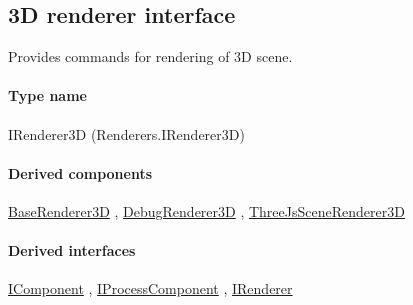 \subsection{3D renderer interface}
\label{Malsys.Processing.Components.Renderers.IRenderer3D}
Provides commands for rendering of 3D scene.\paragraph{Type name}
IRenderer3D (Renderers.IRenderer3D) 	\paragraph{Derived components}
		\hyperref[Malsys.Processing.Components.Renderers.BaseRenderer3D]{BaseRenderer3D}%
, 		\hyperref[Malsys.Processing.Components.Renderers.DebugRenderer3D]{DebugRenderer3D}%
, 		\hyperref[Malsys.Processing.Components.Renderers.ThreeJsSceneRenderer3D]{ThreeJsSceneRenderer3D}%
	\paragraph{Derived interfaces}
		\hyperref[Malsys.Processing.Components.IComponent]{IComponent}%
, 		\hyperref[Malsys.Processing.Components.IProcessComponent]{IProcessComponent}%
, 		\hyperref[Malsys.Processing.Components.IRenderer]{IRenderer}%
	

